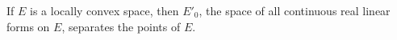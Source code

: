 If $E$ is a locally convex space, then $E'_0$, the space of all continuous real linear forms on $E$, separates the points of $E$.
